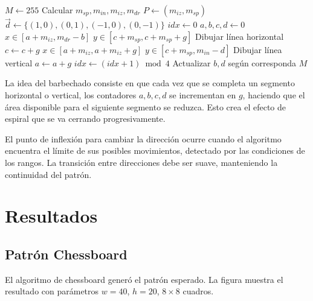 \documentclass[10pt]{article}
\begin{document}
\begin{algorithm}
\caption{Planificación del Algoritmo Spiral}
\begin{algorithmic}[1]
\State $M \gets 255$ 
\State Calcular $m_{sp}, m_{in}, m_{iz}, m_{dr}$
\State $P \gets (m_{iz}, m_{sp})$ 
\State $\vec{d} \gets \{(1,0), (0,1), (-1,0), (0,-1)\}$
\State $idx \gets 0$ 
\State $a,b,c,d \gets 0$ 
        \State $x \in [a + m_{iz}, m_{dr} - b]$ 
        \State $y \in [c + m_{sp}, c + m_{sp} + g]$ 
        \State Dibujar línea horizontal
        \State $c \gets c + g$ 
    \Else
        \State $x \in [a + m_{iz}, a + m_{iz} + g]$ 
        \State $y \in [c + m_{sp}, m_{in} - d]$ 
        \State Dibujar línea vertical
        \State $a \gets a + g$ 
    \EndIf
    \State $idx \gets (idx + 1) \bmod 4$ 
    \State Actualizar $b,d$ según corresponda
\EndWhile
\State \Return $M$
\EndProcedure
\end{algorithmic}
\end{algorithm}

La idea del barbechado consiste en que cada vez que se completa un segmento horizontal o vertical, los contadores $a,b,c,d$ se incrementan en $g$, haciendo que el área disponible para el siguiente segmento se reduzca. Esto crea el efecto de espiral que se va cerrando progresivamente.

El punto de inflexión para cambiar la dirección ocurre cuando el algoritmo encuentra el límite de sus posibles movimientos, detectado por las condiciones de los rangos. La transición entre direcciones debe ser suave, manteniendo la continuidad del patrón.

\section{Resultados}

\subsection{Patrón Chessboard}

El algoritmo de chessboard generó el patrón esperado. La figura muestra el resultado con parámetros $w=40$, $h=20$, $8\times8$ cuadros.
\end{document}
